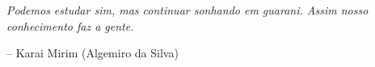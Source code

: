 \chapter*{}

\vspace*{\fill}

\epigraph{\emph{Podemos estudar sim, mas continuar sonhando em guarani. Assim nosso conhecimento faz a gente.}}{-- Karai Mirim (Algemiro da Silva)}

